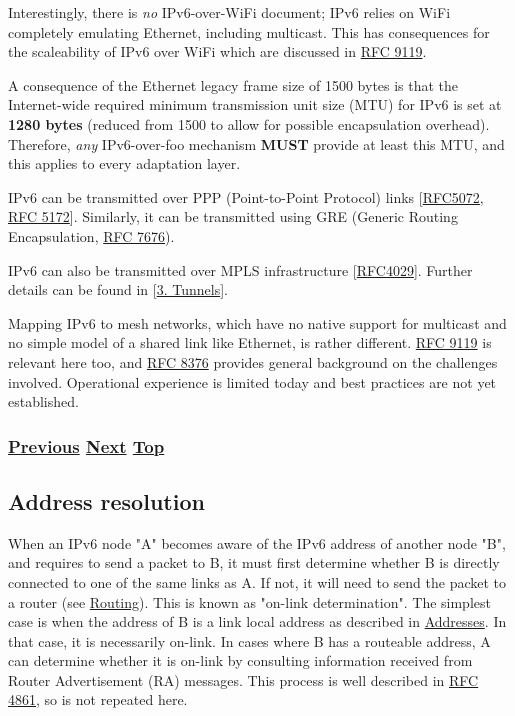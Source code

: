 \documentclass[
]{article}
\begin{document}
Interestingly, there is \emph{no} IPv6-over-WiFi document; IPv6 relies
on WiFi completely emulating Ethernet, including multicast. This has
consequences for the scaleability of IPv6 over WiFi which are discussed
in \href{https://www.rfc-editor.org/info/rfc9119}{RFC 9119}.

A consequence of the Ethernet legacy frame size of 1500 bytes is that
the Internet-wide required minimum transmission unit size (MTU) for IPv6
is set at \textbf{1280 bytes} (reduced from 1500 to allow for possible
encapsulation overhead). Therefore, \emph{any} IPv6-over-foo mechanism
\textbf{MUST} provide at least this MTU, and this applies to every
adaptation layer.

IPv6 can be transmitted over PPP (Point-to-Point Protocol) links
{[}\href{https://www.rfc-editor.org/info/rfc5072}{RFC5072},
\href{https://www.rfc-editor.org/info/rfc5172}{RFC 5172}{]}. Similarly,
it can be transmitted using GRE (Generic Routing Encapsulation,
\href{https://www.rfc-editor.org/info/rfc7676}{RFC 7676}).

IPv6 can also be transmitted over MPLS infrastructure
{[}\href{https://www.rfc-editor.org/info/rfc4029}{RFC4029}{]}. Further
details can be found in {[}\hyperref[tunnels]{3. Tunnels}{]}.

Mapping IPv6 to mesh networks, which have no native support for
multicast and no simple model of a shared link like Ethernet, is rather
different. \href{https://www.rfc-editor.org/info/rfc9119}{RFC 9119} is
relevant here too, and
\href{https://www.rfc-editor.org/info/rfc8376}{RFC 8376} provides
general background on the challenges involved. Operational experience is
limited today and best practices are not yet established.

\subsubsection{\texorpdfstring{\hyperref[addresses]{Previous}
\hyperref[address-resolution]{Next}
\hyperref[ipv6-basic-technology]{Top}}{Previous Next Top}}\label{previous-next-top-9}

\pagebreak

\subsection{Address resolution}\label{address-resolution}

When an IPv6 node "A" becomes aware of the IPv6 address of another node
"B", and requires to send a packet to B, it must first determine whether
B is directly connected to one of the same links as A. If not, it will
need to send the packet to a router (see \hyperref[routing]{Routing}).
This is known as "on-link determination". The simplest case is when the
address of B is a link local address as described in
\hyperref[addresses]{Addresses}. In that case, it is necessarily
on-link. In cases where B has a routeable address, A can determine
whether it is on-link by consulting information received from Router
Advertisement (RA) messages. This process is well described in
\href{https://www.rfc-editor.org/info/rfc4861}{RFC 4861}, so is not
repeated here.
\end{document}
